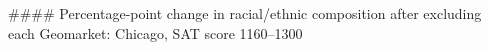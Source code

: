 #### Percentage-point change in racial/ethnic composition after excluding each Geomarket: Chicago, SAT score 1160–1300
